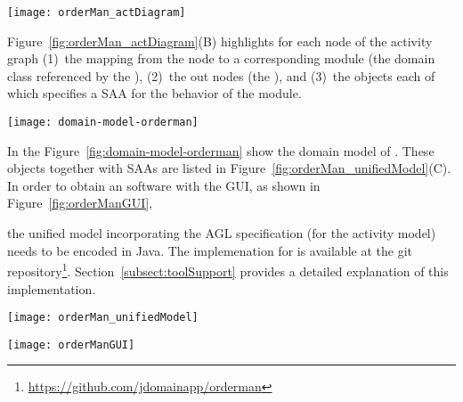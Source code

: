 \begin{figure*}[ht]
	\centering
	\texttt{[image: orderMan\_actDiagram]}
	\caption{The UML activity diagram for the process to handle orders, adapted from~\cite[p.~369]{omg_unified_2015}.} %
	\label{fig:orderMan_actDiagram}
\end{figure*}

Figure~\ref{fig:orderMan_actDiagram}(B) highlights for each node of the activity graph (1)~the mapping from the node to a corresponding module (\wrt the domain class referenced by the ), (2)~the out nodes (\wrt the ), and (3)~the  objects each of which specifies a SAA for the behavior of the module. 

\begin{figure*}[ht]
	\centering
	\texttt{[image: domain-model-orderman]}
	\caption{the domain model of the \orderman} %
	\label{fig:domain-model-orderman}
\end{figure*}
In the Figure~\ref{fig:domain-model-orderman} show the domain model of \orderman. These  objects together with SAAs are listed in Figure~\ref{fig:orderMan_unifiedModel}(C). In order to obtain an \orderman software with the GUI, as shown in Figure~\ref{fig:orderManGUI}, %

the unified model incorporating the AGL specification (for the activity model) needs to be encoded in Java. The implemenation for \orderman is available at the git repository\footnote{\url{https://github.com/jdomainapp/orderman}}. Section~\ref{subsect:toolSupport} provides a detailed explanation of this implementation.
%
\begin{figure*}[ht]
	\centering
	\texttt{[image: orderMan\_unifiedModel]}
	\caption{(A: Left) The activity graph whose nodes are labeled with activity and component classes; (B: Top-right) The  objects; (C: Bottom-right)  objects that are referenced by the .} %
	\label{fig:orderMan_unifiedModel}
\end{figure*}

\begin{figure*}[ht]
	\centering
	\texttt{[image: orderManGUI]}
	\caption{The GUI of the \orderman~software generated by the tool.} %
	\label{fig:orderManGUI}
\end{figure*}

